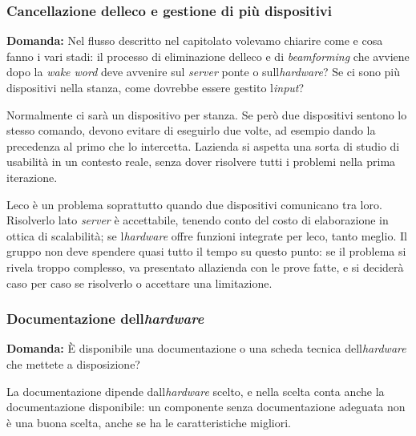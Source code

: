 \documentclass[12pt,a4paper]{article}
\begin{document}
\hypertarget{cancellazione-delleco-e-gestione-di-piuxf9-dispositivi}{%
\subsubsection{Cancellazione dell\textquotesingle eco e gestione di più dispositivi}}

\textbf{Domanda:} Nel flusso descritto nel capitolato volevamo chiarire come e cosa fanno i vari stadi: il processo di eliminazione dell\textquotesingle eco e di \emph{beamforming} che avviene dopo la \emph{wake word} deve avvenire sul \emph{server} ponte o sull\textquotesingle{}\emph{hardware}? Se ci sono più dispositivi nella stanza, come dovrebbe essere gestito l\textquotesingle{}\emph{input}?

Normalmente ci sarà un dispositivo per stanza. Se però due dispositivi sentono lo stesso comando, devono evitare di eseguirlo due volte, ad esempio dando la precedenza al primo che lo intercetta. L\textquotesingle azienda si aspetta una sorta di studio di usabilità in un contesto reale, senza dover risolvere tutti i problemi nella prima iterazione.

L\textquotesingle eco è un problema soprattutto quando due dispositivi comunicano tra loro. Risolverlo lato \emph{server} è accettabile, tenendo conto del costo di elaborazione in ottica di scalabilità; se l\textquotesingle{}\emph{hardware} offre funzioni integrate per l\textquotesingle eco, tanto meglio. Il gruppo non deve spendere quasi tutto il tempo su questo punto: se il problema si rivela troppo complesso, va presentato all\textquotesingle azienda con le prove fatte, e si deciderà caso per caso se risolverlo o accettare una limitazione.

\hypertarget{documentazione-dellhardware}{%
\subsubsection{\texorpdfstring{Documentazione dell\textquotesingle{}\emph{hardware}}{Documentazione dell\textquotesingle hardware}}}

\textbf{Domanda:} È disponibile una documentazione o una scheda tecnica dell\textquotesingle{}\emph{hardware} che mettete a disposizione?

La documentazione dipende dall\textquotesingle{}\emph{hardware} scelto, e nella scelta conta anche la documentazione disponibile: un componente senza documentazione adeguata non è una buona scelta, anche se ha le caratteristiche migliori.
\end{document}
